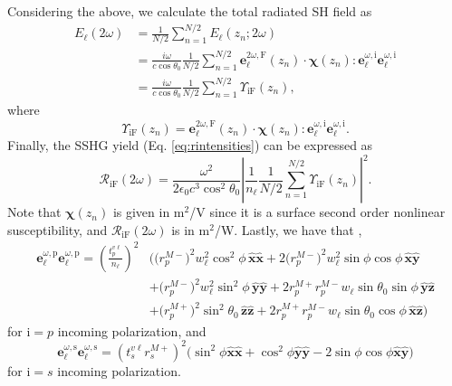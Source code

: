 \documentclass[utf8]{frontiersSCNS}
\begin{document}
Considering the above, we calculate the total radiated SH field as
\begin{equation}\label{eq:e1}
\begin{split}
E_{\ell}(2\omega)
&=
\frac{1}{N/2}
\sum_{n=1}^{N/2}
E_{\ell}(z_{n};2\omega)\\
&=
\frac{i \omega}{c\cos\theta_{0}}\frac{1}{N/2}
\sum_{n=1}^{N/2}
\mathbf{e}^{2\omega,\mathrm{F}}_{\ell}(z_{n})\cdot 
\boldsymbol{\chi}(z_{n})
:\mathbf{e}^{\omega,\mathrm{i}}_{\ell}
\mathbf{e}^{\omega,\mathrm{i}}_{\ell}\\
&=
\frac{i \omega}{c\cos\theta_{0}}\frac{1}{N/2}
\sum_{n=1}^{N/2}\Upsilon_{\mathrm{iF}}(z_{n}),
\end{split}
\end{equation}
where
\begin{equation}\label{ez.3}
\Upsilon_{\mathrm{iF}}(z_{n}) =
\mathbf{e}^{2\omega,\mathrm{F}}_{\ell}(z_{n})\cdot 
\boldsymbol{\chi}(z_{n}) : 
\mathbf{e}^{\omega,\mathrm{i}}_{\ell}
\mathbf{e}^{\omega,\mathrm{i}}_{\ell}.
\end{equation}
Finally, the SSHG yield (Eq. \eqref{eq:rintensities}) can be expressed as
\begin{equation}\label{eq:mc6}
\mathcal{R}_{\mathrm{iF}}(2\omega) 
=
\frac{\omega^{2}}{2\epsilon_{0}c^3\cos^{2}\theta_{0}}
\left\vert\frac{1}{n_{\ell}}
\frac{1}{N/2}
\sum_{n=1}^{N/2}
\Upsilon_{\mathrm{iF}}(z_{n})
\right\vert^{2}.
\end{equation}
Note that $\boldsymbol{\chi}(z_{n})$ is given in m$^{2}$/V since it is a surface
second order nonlinear susceptibility, and $\mathcal{R}_{\mathrm{iF}}(2\omega)$
is in m$^{2}$/W. Lastly, we have that \citep{andersonPRB16b},
\begin{equation}\label{eq:ewewpmrn}
\begin{split}
\mathbf{e}^{\omega,\mathrm{p}}_{\ell}\mathbf{e}^{\omega,\mathrm{p}}_{\ell} =
\left(\frac{t^{v\ell}_{p}}{n_{\ell}}\right)^{2}
&\bigg(
   \big(r^{M-}_{p}\big)^{2}w^{2}_{\ell}\cos^{2}\phi\,
   \mathbf{\hat{x}}\mathbf{\hat{x}}
 + 2\big(r^{M-}_{p}\big)^{2}w^{2}_{\ell}\sin\phi\cos\phi\,
   \mathbf{\hat{x}}\mathbf{\hat{y}}\\
&+ \big(r^{M-}_{p}\big)^{2}w^{2}_{\ell}\sin^{2}\phi\,
   \mathbf{\hat{y}}\mathbf{\hat{y}}
 + 2r^{M+}_{p}r^{M-}_{p}w_{\ell}\sin\theta_{0}\sin\phi\,
   \mathbf{\hat{y}}\mathbf{\hat{z}}\\
&+ \big(r^{M+}_{p}\big)^{2}\sin^{2}\theta_{0}\,
   \mathbf{\hat{z}}\mathbf{\hat{z}}
 + 2r^{M+}_{p}r^{M-}_{p}w_{\ell}\sin\theta_{0}\cos\phi\,
   \mathbf{\hat{x}}\mathbf{\hat{z}}
\bigg)
\end{split}
\end{equation}
for $\mathrm{i} = p$ incoming polarization, and
\begin{equation}\label{eq:ewewsmrn}
\mathbf{e}^{\omega,\mathrm{s}}_{\ell}\mathbf{e}^{\omega,\mathrm{s}}_{\ell}
= \left(t^{v\ell}_{s}r^{M+}_{s}\right)^{2}
\big(
  \sin^{2}\phi\mathbf{\hat{x}}\mathbf{\hat{x}}
+ \cos^{2}\phi\mathbf{\hat{y}}\mathbf{\hat{y}}
- 2\sin\phi\cos\phi\mathbf{\hat{x}}\mathbf{\hat{y}}
\big)
\end{equation}
for $\mathrm{i} = s$ incoming polarization.
 
\end{document}

